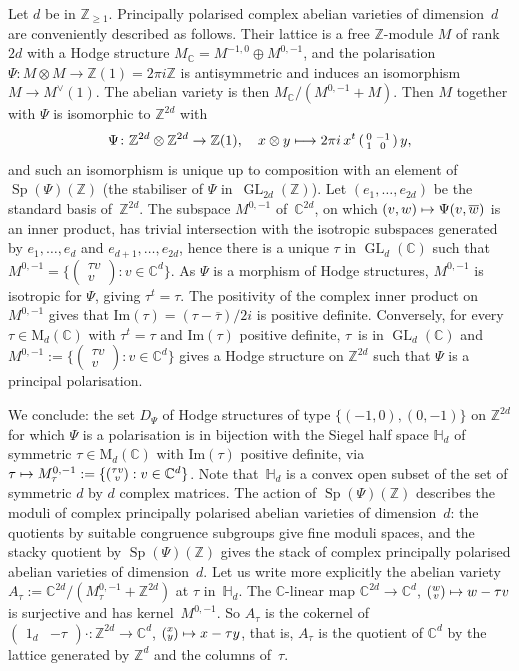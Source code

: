\documentclass[11pt]{article}
\providecommand{\C}{}
\def\mto{\mathchoice{\longmapsto}{\mapsto}{\mapsto}{\mapsto}}
\let\oldvee\vee
\renewcommand{\vee}{{\scriptscriptstyle\oldvee}}
\theoremstyle{plain}
\theoremstyle{definition}
\numberwithin{equation}{subsection}
\let\ol\overline
\renewcommand{\C}{\mathbb C}
\newcommand{\Z}{\mathbb Z}
\renewcommand{\H}{\mathbb H}
\newcommand{\rmM}{\mathrm{M}}
\renewcommand{\Im}{\mathrm{Im}}
\DeclareMathOperator{\GL}{GL}
\DeclareMathOperator{\Sp}{Sp}
\begin{document}
Let $d$ be in $\Z_{\geq1}$. Principally polarised complex abelian
varieties of dimension~$d$ are conveniently described as
follows. Their lattice is a free $\Z$-module $M$ of rank $2d$ with a
Hodge structure $M_\C=M^{-1,0}\oplus M^{0,-1}$, and the polarisation
$\Psi\colon M\otimes M\to \Z(1)=2\pi i\Z$ is antisymmetric and induces
an isomorphism $M\to M^\vee(1)$. The abelian variety is then
$M_\C/(M^{0,-1}+M)$. Then $M$ together with $\Psi$ is isomorphic to
$\Z^{2d}$ with
\[
\Psi\colon \Z^{2d}\otimes\Z^{2d}\to\Z(1),\quad x\otimes
y\mto 2\pi i\,x^t\,(\begin{smallmatrix} 0 & -1\\ 1 &
0\end{smallmatrix})\,y,
\]
and such an isomorphism is unique up to
composition with an element of~$\Sp(\Psi)(\Z)$ (the stabiliser of
$\Psi$ in~$\GL_{2d}(\Z)$). Let $(e_1,\ldots,e_{2d})$ be the standard
basis of~$\Z^{2d}$. The subspace $M^{0,-1}$ of~$\C^{2d}$, on which
$(v,w)\mto \Psi(v,\ol{w})$ is an inner product, has trivial
intersection with the isotropic subspaces generated by
$e_1,\ldots,e_d$ and $e_{d+1},\ldots,e_{2d}$, hence there is a unique
$\tau$ in $\GL_d(\C)$ such that $M^{0,-1}=\{(\substack{\tau v\\ v}) :
v\in\C^d\}$. As $\Psi$ is a morphism of Hodge structures, $M^{0,-1}$
is isotropic for $\Psi$, giving $\tau^t=\tau$. The positivity of the
complex inner product on $M^{0,-1}$ gives that
$\Im(\tau)=(\tau-\ol{\tau})/2i$ is positive definite. Conversely, for
every $\tau\in\rmM_d(\C)$ with $\tau^t=\tau$ and $\Im(\tau)$ positive
definite, $\tau$~is in $\GL_d(\C)$ and $M^{0,-1}:=\{(\substack{\tau v\\
v}) : v\in\C^d\}$ gives a Hodge structure on $\Z^{2d}$ such that
$\Psi$ is a principal polarisation.

We conclude: the set $D_\Psi$ of Hodge structures of type
$\{(-1,0),(0,-1)\}$ on $\Z^{2d}$ for which $\Psi$ is a polarisation is
in bijection with the Siegel half space $\H_d$ of symmetric
$\tau\in\rmM_d(\C)$ with $\Im(\tau)$ positive definite, via
$\tau\mto M^{0,-1}_\tau:=\{(\substack{\tau v\\ v}) :
v\in\C^d\}$. Note that~$\H_d$ is a convex open subset of the set of
symmetric $d$ by $d$ complex matrices. The action of $\Sp(\Psi)(\Z)$
describes the moduli of complex principally polarised abelian
varieties of dimension~$d$: the quotients by suitable congruence
subgroups give fine moduli spaces, and the stacky quotient by
$\Sp(\Psi)(\Z)$ gives the stack of complex principally polarised
abelian varieties of dimension~$d$. Let us write more explicitly the
abelian variety $A_\tau:=\C^{2d}/(M^{0,-1}_\tau+\Z^{2d})$ at $\tau$
in~$\H_d$. The $\C$-linear map $\C^{2d}\to\C^d$, $(\substack{w\\
v})\mto w-\tau v$ is surjective and has kernel~$M^{0,-1}$. So
$A_\tau$ is the cokernel of $(\begin{matrix} 1_d &
-\tau\end{matrix}){\cdot} \colon\Z^{2d}\to \C^d$, $(\substack{x\\
y})\mto x-\tau y$, that is, $A_\tau$ is the quotient of $\C^d$ by
the lattice generated by $\Z^d$ and the columns of~$\tau$.
\end{document}
